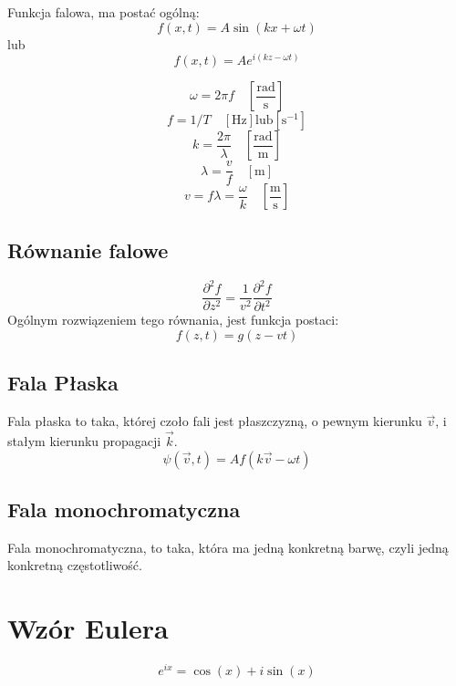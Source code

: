 \documentclass{../notatki}
\begin{document}
Funkcja falowa, ma postać ogólną:
$$
f(x, t) = A \sin(kx + \omega t)
$$
lub
$$
f(x, t) = Ae^{i(kz - \omega t)}
$$

$$
\omega = 2 \pi f \quad\left[\frac{\textrm{rad}}{\textrm{s}}\right]
$$
$$
f = 1/T \quad\left[\textrm{Hz}\right] \text{lub} \left[\textrm{s}^{-1}\right]
$$
$$
k = \frac{2 \pi}{\lambda} \quad\left[\frac{\textrm{rad}}{\textrm{m}}\right]
$$
$$
\lambda = \frac{v}{f} \quad[\textrm{m}]
$$
$$
v = f\lambda = \frac{\omega}{k} \quad\left[\frac{\textrm{m}}{\textrm{s}}\right]
$$

\subsection{Równanie falowe}

$$
\frac{\partial^2 f}{\partial z^2} = \frac{1}{v^2} \frac{\partial^2
f}{\partial t^2}
$$
Ogólnym rozwiązeniem tego równania, jest funkcja postaci:
$$
f(z, t) = g(z - vt)
$$

\subsection{Fala Płaska}

Fala płaska to taka, której czoło fali jest płaszczyzną, o pewnym
kierunku $\vec{v}$, i stałym kierunku propagacji $\vec{k}$.
$$
\psi(\vec{v}, t) = A f(k \vec{v} - \omega t)
$$

\subsection{Fala monochromatyczna}

Fala monochromatyczna, to taka, która ma jedną konkretną barwę, czyli jedną
konkretną częstotliwość.

\section{Wzór Eulera}

$$
e^{ix} = \cos(x) + i \sin(x)
$$
\end{document}

